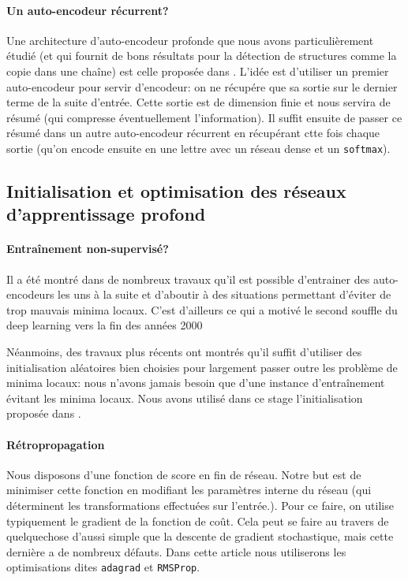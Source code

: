 \documentclass[a4paper,11pt, twocolumn]{article}
\begin{document}
\paragraph{Un auto-encodeur récurrent?}

Une architecture d'auto-encodeur profonde que nous avons particulièrement étudié
(et qui fournit de bons résultats pour la détection de structures comme la copie
dans une chaîne) est celle proposée dans \cite{DBLP:journals/corr/ChoMGBSB14}.
L'idée est d'utiliser un premier auto-encodeur pour servir d'encodeur: on ne
récupére que sa sortie sur le dernier terme de la suite d'entrée. Cette sortie
est de dimension finie et nous servira de résumé (qui compresse éventuellement
l'information). Il suffit ensuite de passer ce résumé dans un autre
auto-encodeur récurrent en récupérant ctte fois chaque sortie (qu'on encode
ensuite en une lettre avec un réseau dense et un \texttt{softmax}).

\subsection{Initialisation et optimisation des réseaux d'apprentissage profond}

\paragraph{Entraînement non-supervisé?}

Il a été montré dans de nombreux travaux qu'il est possible d'entrainer des
auto-encodeurs les uns à la suite et d'aboutir à des situations permettant
d'éviter de trop mauvais minima locaux. C'est d'ailleurs ce qui a motivé le
second souffle du deep learning vers la fin des années 2000

Néanmoins, des travaux plus récents ont montrés qu'il suffit d'utiliser des
initialisation aléatoires bien choisies pour largement passer outre les problème
de minima locaux: nous n'avons jamais besoin que d'une instance d'entraînement
évitant les minima locaux. Nous avons utilisé dans ce stage l'initialisation
proposée dans .

\paragraph{Rétropropagation}

Nous disposons d'une fonction de score en fin de réseau. Notre but est de
minimiser cette fonction en modifiant les paramètres interne du réseau (qui
déterminent les transformations effectuées sur l'entrée.). Pour ce faire, on
utilise typiquement le gradient de la fonction de coût. Cela peut se faire au
travers de quelquechose d'aussi simple que la descente de gradient stochastique, mais cette
dernière a de nombreux défauts. Dans cette article nous utiliserons les
optimisations dites \texttt{adagrad} et \texttt{RMSProp}.
\end{document}
